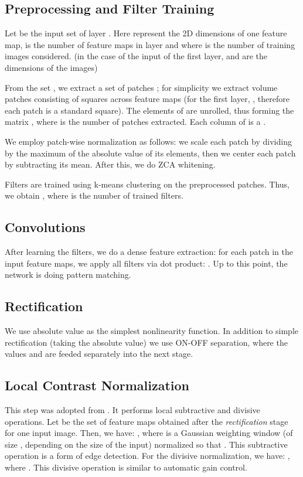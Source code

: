 \documentclass[runningheads]{llncs}
\begin{document}
\subsection{Preprocessing and Filter Training}
Let  be the input set of layer .
Here  represent the 2D dimensions of one feature map,  is the number of feature maps in layer  and  where  is the number of training images considered. (in the case of the input of the first layer,  and  are the dimensions of the images)

From the set , we extract a set of patches ; for simplicity we extract volume patches consisting of  squares across  feature maps (for the first layer, , therefore each patch is a standard  square).
The elements of  are unrolled, thus forming the matrix , where  is the number of patches extracted. Each column of  is a .

We employ patch-wise normalization as follows: we scale each patch by dividing by the maximum of the absolute value of its elements, then we center each patch by subtracting its mean.
After this, we do ZCA whitening. 

Filters are trained using k-means clustering on the preprocessed patches. Thus, we obtain , where  is the number of trained filters.

\subsection{Convolutions}
After learning the filters, we do a dense feature extraction: for each patch in the input feature maps, we apply all filters via dot product: . Up to this point, the network is doing pattern matching.

\subsection{Rectification}
We use absolute value as the simplest nonlinearity function. In addition to simple rectification (taking the absolute value) we use ON-OFF separation, where the values  and  are feeded separately into the next stage.

\subsection{Local Contrast Normalization}
This step was adopted from \cite{jarrett-iccv-09}. It performs local subtractive and divisive operations.
Let  be the set of feature maps obtained after the \textit{rectification} stage for one input image.
Then, we have: , where  is a Gaussian weighting window (of size ,  depending on the size of the input) normalized so that . This subtractive operation is a form of edge detection.
For the divisive normalization, we have: , where . This divisive operation is similar to automatic gain control.
\end{document}
